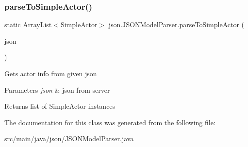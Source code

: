 \subsubsection{\texorpdfstring{parse\+To\+Simple\+Actor()}{parseToSimpleActor()}}
{\footnotesize\ttfamily static Array\+List$<$Simple\+Actor$>$ json.\+J\+S\+O\+N\+Model\+Parser.\+parse\+To\+Simple\+Actor (\begin{DoxyParamCaption}\item[{J\+S\+O\+N\+Array}]{json }\end{DoxyParamCaption})\hspace{0.3cm}{\ttfamily [static]}}

Gets actor info from given json 
\begin{DoxyParams}{Parameters}
{\em json} & json from server \\
\hline
\end{DoxyParams}
\begin{DoxyReturn}{Returns}
list of Simple\+Actor instances 
\end{DoxyReturn}


The documentation for this class was generated from the following file\+:\begin{DoxyCompactItemize}
\item 
src/main/java/json/J\+S\+O\+N\+Model\+Parser.\+java\end{DoxyCompactItemize}

